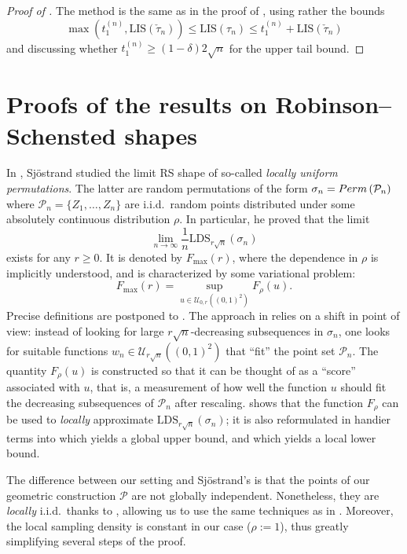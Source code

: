 \documentclass{article}
\theoremstyle{remark}
\def\LIS{\mathrm{LIS}}
\def\LDS{\mathrm{LDS}}
\def\opencarre{(0,1)^2}
\def\pts{\mathcal{P}}
\newcommand{\perm}[1]{{\rm Perm}\left(#1\right)}
\def\Usjo{\mathcal{U}}
\begin{document}
\begin{proof}[Proof of ]
    The method is the same as in the proof of , using rather the bounds
    \begin{equation*}
        \max\left( t_1^{(n)} , \LIS(\check\tau_n) \right) \le \LIS(\tau_n) \le t_1^{(n)} + \LIS(\check\tau_n)
    \end{equation*}
    and discussing whether $t_1^{(n)}\ge (1-\delta)2\sqrt n$ for the upper tail bound.
\end{proof}


\section{Proofs of the results on Robinson--Schensted shapes}
\label{sec: proof RS}

In \cite{S23}, Sj\"ostrand studied the limit RS shape of so-called \textit{locally uniform permutations}.
The latter are random permutations of the form $\sigma_n = \perm{\pts_n}$ where $\pts_n = \{Z_1,\dots,Z_n\}$ are i.i.d.~random points distributed under some absolutely continuous distribution $\rho$.
In particular, he proved \cite[Theorem~10.2]{S23} that the limit
\[
    \lim_{n\to\infty} \frac1n \LDS_{r\sqrt n}\left(\sigma_n\right)
\]
exists for any $r\ge0$.
It is denoted by $F_{\max}(r)$, where the dependence in $\rho$ is implicitly understood, and is characterized by some variational problem:
\[
    F_{\max}(r) = \sup_{u\in \Usjo_{0,r}\left(\opencarre\right)} F_\rho(u) .
\]
Precise definitions are postponed to .
The approach in \cite{S23} relies on a shift in point of view:
instead of looking for large $r\sqrt n$-decreasing subsequences in $\sigma_n$, one looks for suitable functions $w_n \in \Usjo_{r\sqrt n}\left( \opencarre \right)$ that ``fit'' the point set $\pts_n$.
The quantity $F_\rho(u)$ is constructed so that it can be thought of as a ``score'' associated with $u$, that is, a measurement of how well the function $u$ should fit the decreasing subsequences of $\pts_n$ after rescaling.
\cite[Proposition~4.5]{S23} shows that the function $F_\rho$ can be used to \textit{locally} approximate $\LDS_{r\sqrt n}\left(\sigma_n\right)$;
it is also reformulated in handier terms into \cite[Lemma~8.2]{S23} which yields a global upper bound, and \cite[Lemma~6.3]{S23} which yields a local lower bound.

The difference between our setting and Sj\"ostrand's is that the points of our geometric construction $\pts$ are not globally independent.
Nonetheless, they are \textit{locally} i.i.d.~thanks to , allowing us to use the same techniques as in \cite{S23}.
Moreover, the local sampling density is constant in our case ($\rho:=1$), thus greatly simplifying several steps of the proof.
\end{document}
